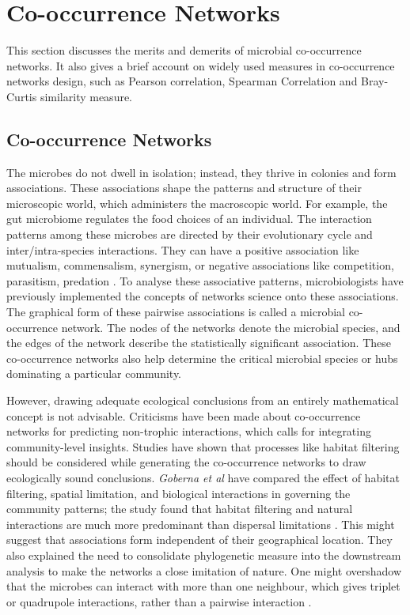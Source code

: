 \chapter{Co-occurrence Networks}
 \setcounter{page}{18}

This section discusses the merits and demerits of microbial co-occurrence networks. It also gives a brief account on widely used measures in co-occurrence networks design, such as Pearson correlation, Spearman Correlation and Bray-Curtis similarity measure.

\section{Co-occurrence Networks}
The microbes do not dwell in isolation; instead, they thrive in colonies and form associations. These associations shape the patterns and structure of their microscopic world, which administers the macroscopic world. For example, the gut microbiome regulates the food choices of an individual. The interaction patterns among these microbes are directed by their evolutionary cycle and inter/intra-species interactions. They can have a positive association like mutualism, commensalism, synergism, or negative associations like competition, parasitism, predation \cite{weiss_2016_correlation}. To analyse these associative patterns, microbiologists have previously implemented the concepts of networks science onto these associations. The graphical form of these pairwise associations is called a microbial co-occurrence network. The nodes of the networks denote the microbial species, and the edges of the network describe the statistically significant association. These co-occurrence networks also help determine the critical microbial species or hubs dominating a particular community.\newline

However, drawing adequate ecological conclusions from an entirely mathematical concept is not advisable. Criticisms have been made about co-occurrence networks for predicting non-trophic interactions, which calls for integrating community-level insights. Studies have shown that processes like habitat filtering should be considered while generating the co-occurrence networks to draw ecologically sound conclusions. \emph{Goberna et al} have compared the effect of habitat filtering, spatial limitation, and biological interactions in governing the community patterns; the study found that habitat filtering and natural interactions are much more predominant than dispersal limitations \cite{ref10}. This might suggest that associations form independent of their geographical location. They also explained the need to consolidate phylogenetic measure into the downstream analysis to make the networks a close imitation of nature. One might overshadow that the microbes can interact with more than one neighbour, which gives triplet or quadrupole interactions, rather than a pairwise interaction \cite{berry_2014_deciphering}.

